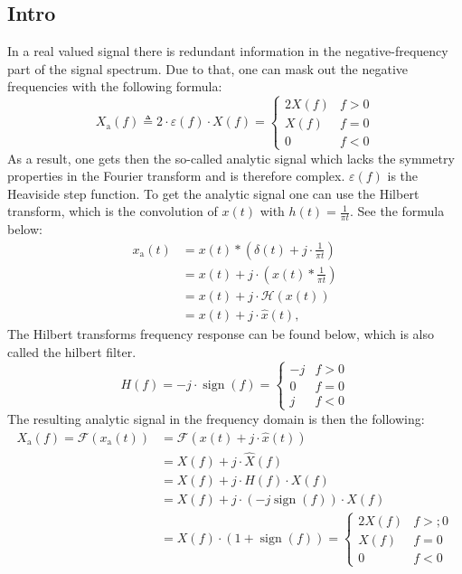\subsection{Intro}
In a real valued signal there is redundant information in the negative-frequency part of the signal spectrum. Due to that, one can mask out the negative frequencies with the following formula:
$$
X_{\mathrm{a}}(f) \triangleq 2 \cdot \varepsilon(f) \cdot X(f)= \begin{cases}2 X(f) & f> 0 \\ X(f) & f=0 \\ 0 & f< 0\end{cases}
$$
As a result, one gets then the so-called analytic signal which lacks the symmetry properties in the Fourier transform and is therefore complex. $\varepsilon(f)$ is the Heaviside step function. To get the analytic signal one can use the Hilbert transform, which is the convolution of $x(t)$ with $h(t)=\frac{1}{\pi t}$. See the formula below:
$$
\begin{aligned}
x_{\mathrm{a}}(t) &=x(t) *\left(\delta(t)+j \cdot \frac{1}{\pi t}\right) \\
&=x(t)+j \cdot\left(x(t) * \frac{1}{\pi t}\right) \\
&=x(t)+j \cdot \mathcal{H}(x(t)) \\
&=x(t)+j \cdot \hat{x}(t),
\end{aligned}
$$
The Hilbert transforms frequency response can be found below, which is also called the hilbert filter.
$$
H(f)=-j \cdot \operatorname{sign}(f)= \begin{cases}-j & f>0 \\ 0 & f=0 \\ j & f<0\end{cases}
$$
The resulting analytic signal in the frequency domain is then the following:
$$
\begin{aligned}
X_{\mathrm{a}}(f)=\mathcal{F}\left(x_{\mathrm{a}}(t)\right) &=\mathcal{F}(x(t)+j \cdot \hat{x}(t)) \\
&=X(f)+j \cdot \hat{X}(f) \\
&=X(f)+j \cdot H(f) \cdot X(f) \\
&=X(f)+j \cdot(-j \operatorname{sign}(f)) \cdot X(f) \\
&=X(f) \cdot(1+\operatorname{sign}(f))= \begin{cases}2 X(f) & f>;0 \\
X(f) & f=0 \\
0 & f<0\end{cases}
\end{aligned}
$$
